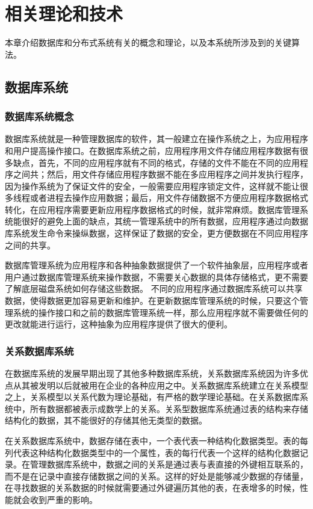 
\chapter{相关理论和技术}
本章介绍数据库和分布式系统有关的概念和理论，以及本系统所涉及到的关键算法。
\section{数据库系统}
\subsection{数据库系统概念}
数据库系统就是一种管理数据库的软件，其一般建立在操作系统之上，为应用程序和用户提高操作接口。在数据库系统之前，应用程序用文件存储应用程序数据有很多缺点，首先，不同的应用程序就有不同的格式，存储的文件不能在不同的应用程序之间共；然后，用文件存储应用程序数据不能在多应用程序之间并发执行程序，因为操作系统为了保证文件的安全，一般需要应用程序锁定文件，这样就不能让很多线程或者进程去操作应用数据；最后，用文件存储数据不方便应用程序数据格式转化，在应用程序需要更新应用程序数据格式的时候，就非常麻烦。数据库管理系统能很好的避免上面的缺点，其统一管理系统中的所有数据，应用程序通过向数据库系统发生命令来操纵数据，这样保证了数据的安全，更方便数据在不同应用程序之间的共享。

数据库管理系统为应用程序和各种抽象数据提供了一个软件抽象层，应用程序或者用户通过数据库管理系统来操作数据，不需要关心数据的具体存储格式，更不需要了解底层磁盘系统如何存储这些数据。
不同的应用程序通过数据库系统可以共享数据，使得数据更加容易更新和维护。在更新数据库管理系统的时候，只要这个管理系统的操作接口和之前的数据库管理系统一样，那么应用程序就不需要做任何的更改就能进行运行，这种抽象为应用程序提供了很大的便利。
\subsection{关系数据库系统}
在数据库系统的发展早期出现了其他多种数据库系统，关系数据库系统因为许多优点从其被发明以后就被用在企业的各种应用之中。关系数据库系统建立在关系模型之上，关系模型以关系代数为理论基础，有严格的数学理论基础。在关系数据库系统中，所有数据都被表示成数学上的关系。关系型数据库系统通过表的结构来存储结构化的数据，其不能很好的存储其他无类型的数据。

在关系数据库系统中，数据存储在表中，一个表代表一种结构化数据类型。表的每列代表这种结构化数据类型中的一个属性，表的每行代表一个这样的结构化数据记录。在管理数据库系统中，数据之间的关系是通过表与表直接的外键相互联系的，而不是在记录中直接存储数据之间的关系。这样的好处是能够减少数据的存储量，在寻找数据的关系数据的时候就需要通过外键遍历其他的表，在表增多的时候，性能就会收到严重的影响。

